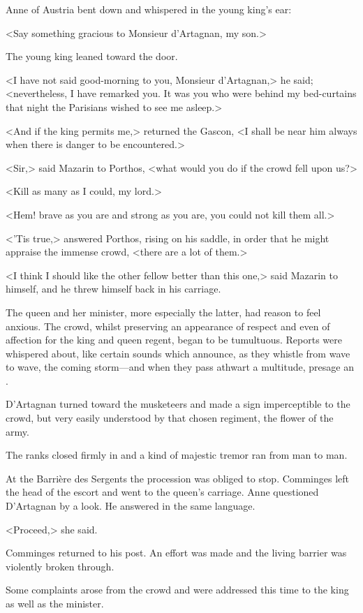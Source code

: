 Anne of Austria bent down and whispered in the young king's ear:

<Say something gracious to Monsieur d'Artagnan, my son.>

The young king leaned toward the door.

<I have not said good-morning to you, Monsieur d'Artagnan,> he said; <nevertheless, I have remarked you. It was you who were behind my bed-curtains that night the Parisians wished to see me asleep.>

<And if the king permits me,> returned the Gascon, <I shall be near him always when there is danger to be encountered.>

<Sir,> said Mazarin to Porthos, <what would you do if the crowd fell upon us?>

<Kill as many as I could, my lord.>

<Hem! brave as you are and strong as you are, you could not kill them all.>

<'Tis true,> answered Porthos, rising on his saddle, in order that he might appraise the immense crowd, <there are a lot of them.>

<I think I should like the other fellow better than this one,> said Mazarin to himself, and he threw himself back in his carriage.

The queen and her minister, more especially the latter, had reason to feel anxious. The crowd, whilst preserving an appearance of respect and even of affection for the king and queen regent, began to be tumultuous. Reports were whispered about, like certain sounds which announce, as they whistle from wave to wave, the coming storm—and when they pass athwart a multitude, presage an .

D'Artagnan turned toward the musketeers and made a sign imperceptible to the crowd, but very easily understood by that chosen regiment, the flower of the army.

The ranks closed firmly in and a kind of majestic tremor ran from man to man.

At the Barrière des Sergents the procession was obliged to stop. Comminges left the head of the escort and went to the queen's carriage. Anne questioned D'Artagnan by a look. He answered in the same language.

<Proceed,> she said.

Comminges returned to his post. An effort was made and the living barrier was violently broken through.

Some complaints arose from the crowd and were addressed this time to the king as well as the minister.

